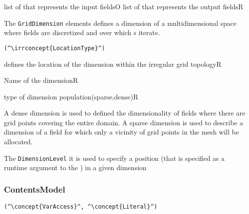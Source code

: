 \begin{HIRChildElements}
	{list of  that represents the input fields}{O}
	{list of  that represents the output fields}{R}
\end{HIRChildElements}


The {\tt GridDimension} elements defines a dimension of a multidimensional space where fields are discretized and over which s iterate.

\HIRContentsModel{ }

\begin{lstlisting}[style=default,frame=none]
(^\irrconcept{LocationType}^)
\end{lstlisting}

\begin{HIRChildElements}
	{defines the location of the dimension within the irregular grid topology}{R}
\end{HIRChildElements}

\begin{HIRAttributes}
	{Name of the dimension}{R}
\end{HIRAttributes}
\begin{HIRIrrAttributesVal}
	{type of dimension population}{(sparse,dense)}{R}
\end{HIRIrrAttributesVal}

A dense dimension is used to defined the dimensionality of fields
where there are grid points covering the entire domain. 
A sparse dimension is used to describe a dimension
 of a field for which only a vicinity of grid points in the mesh
 will be allocated.
 

The {\tt DimensionLevel} it is used to specify a position (that is specified as a runtime argument to the ) in a given dimension

\subsubsection*{ContentsModel}{}

\begin{lstlisting}[style=default,frame=none]
(^\concept{VarAccess}^, ^\concept{Literal}^)
\end{lstlisting}

